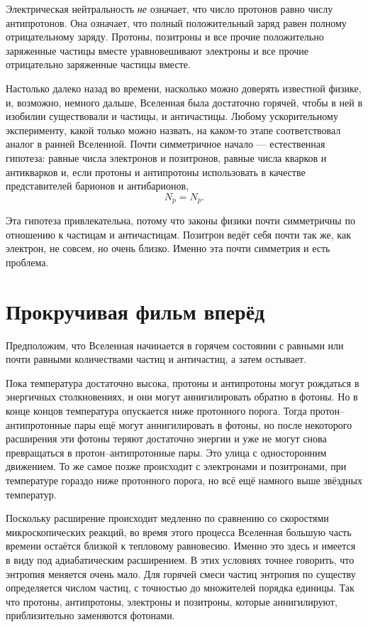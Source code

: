 Электрическая нейтральность \emph{не} означает, что число протонов равно числу антипротонов. Она означает, что полный положительный заряд равен полному отрицательному заряду. Протоны, позитроны и все прочие положительно заряженные частицы вместе уравновешивают электроны и все прочие отрицательно заряженные частицы вместе.

Настолько далеко назад во времени, насколько можно доверять известной физике, и, возможно, немного дальше, Вселенная была достаточно горячей, чтобы в ней в изобилии существовали и частицы, и античастицы. Любому ускорительному эксперименту, какой только можно назвать, на каком-то этапе соответствовал аналог в ранней Вселенной. Почти симметричное начало — естественная гипотеза: равные числа электронов и позитронов, равные числа кварков и антикварков и, если протоны и антипротоны использовать в качестве представителей барионов и антибарионов,
\[
N_p = N_{\bar p}.
\]

Эта гипотеза привлекательна, потому что законы физики почти симметричны по отношению к частицам и античастицам. Позитрон ведёт себя почти так же, как электрон, не совсем, но очень близко. Именно эта почти симметрия и есть проблема.

\section{Прокручивая фильм вперёд}

Предположим, что Вселенная начинается в горячем состоянии с равными или почти равными количествами частиц и античастиц, а затем остывает.

Пока температура достаточно высока, протоны и антипротоны могут рождаться в энергичных столкновениях, и они могут аннигилировать обратно в фотоны. Но в конце концов температура опускается ниже протонного порога. Тогда протон--антипротонные пары ещё могут аннигилировать в фотоны, но после некоторого расширения эти фотоны теряют достаточно энергии и уже не могут снова превращаться в протон--антипротонные пары. Это улица с односторонним движением. То же самое позже происходит с электронами и позитронами, при температуре гораздо ниже протонного порога, но всё ещё намного выше звёздных температур.

Поскольку расширение происходит медленно по сравнению со скоростями микроскопических реакций, во время этого процесса Вселенная большую часть времени остаётся близкой к тепловому равновесию. Именно это здесь и имеется в виду под адиабатическим расширением. В этих условиях точнее говорить, что энтропия меняется очень мало. Для горячей смеси частиц энтропия по существу определяется числом частиц, с точностью до множителей порядка единицы. Так что протоны, антипротоны, электроны и позитроны, которые аннигилируют, приблизительно заменяются фотонами.

